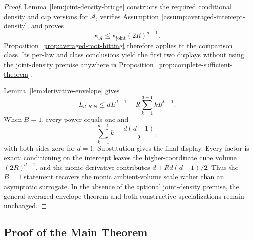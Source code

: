 \begin{proof}
Lemma~\ref{lem:joint-density-bridge} constructs the required conditional
density and cap versions for $\mathcal A$, verifies
Assumption~\ref{assump:averaged-intercept-density}, and proves
\[
\bar\kappa_{\mathcal A}
\leq\kappa_{\mathrm{joint}}(2R)^{d-1}.
\]
Proposition~\ref{prop:averaged-root-hitting} therefore applies to the
comparison class.  Its per-law and class conclusions yield the first two
displays without using the joint-density premise anywhere in
Proposition~\ref{prop:complete-sufficient-theorem}.

Lemma~\ref{lem:derivative-envelope} gives
\[
L_{d,R,\Theta}
\leq dB^{d-1}+R\sum_{k=1}^{d-1}kB^{k-1}.
\]
When $B=1$, every power equals one and
\[
\sum_{k=1}^{d-1}k=\frac{d(d-1)}2,
\]
with both sides zero for $d=1$.  Substitution gives the final display.
Every factor is exact: conditioning on the intercept leaves the
higher-coordinate cube volume $(2R)^{d-1}$, and the monic derivative
contributes $d+Rd(d-1)/2$.  Thus the $B=1$ statement recovers the monic
ambient-volume scale rather than an asymptotic surrogate.  In the absence
of the optional joint-density premise, the general averaged-envelope
theorem and both constructive specializations remain unchanged.
\end{proof}

\subsection{Proof of the Main Theorem}

